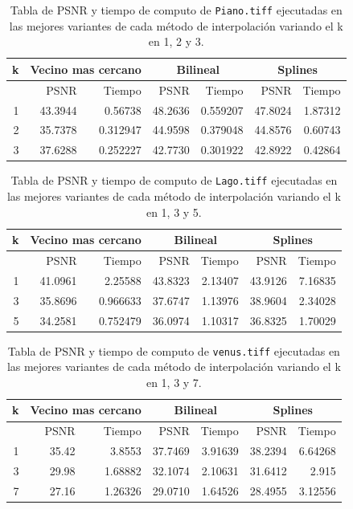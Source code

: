 \documentclass[a4paper]{article}
\newcounter{col}
\begin{document}
\begin{table}[H]
\centering
\begin{tabular}{|r|r|r|r|r|r|r|}
\hline
\multicolumn{1}{|c|}{k} & \multicolumn{2}{|c|}{Vecino mas cercano} & \multicolumn{2}{|c|}{Bilineal} & \multicolumn{2}{|c|}{Splines} \\ \hline
  & PSNR & Tiempo & PSNR & Tiempo & PSNR & Tiempo \\ \hline
1 & 43.3944& 0.56738 & 48.2636 &  0.559207 &  47.8024 & 1.87312 \\ \hline
2 & 35.7378 & 0.312947 & 44.9598 & 0.379048 &  44.8576 & 0.60743 \\ \hline
3 & 37.6288& 0.252227 & 42.7730 & 0.301922 &  42.8922 & 0.42864 \\ \hline
\end{tabular}
\caption{Tabla de PSNR y tiempo de computo de \texttt{Piano.tiff} ejecutadas en las mejores variantes de cada m\'etodo de interpolaci\'on variando el k en 1, 2 y 3.}
\label{}
\end{table}


\begin{table}[H]
\centering
\begin{tabular}{|r|r|r|r|r|r|r|}
\hline
\multicolumn{1}{|c|}{k} & \multicolumn{2}{|c|}{Vecino mas cercano} & \multicolumn{2}{|c|}{Bilineal} & \multicolumn{2}{|c|}{Splines} \\ \hline
  & PSNR & Tiempo & PSNR & Tiempo & PSNR & Tiempo \\ \hline
1 & 41.0961 & 2.25588 & 43.8323 & 2.13407 &  43.9126 & 7.16835 \\ \hline
3 & 35.8696 & 0.966633 & 37.6747 & 1.13976 &  38.9604 & 2.34028 \\ \hline
5 & 34.2581& 0.752479 & 36.0974 & 1.10317 &  36.8325 & 1.70029 \\ \hline
\end{tabular}
\caption{Tabla de PSNR y tiempo de computo de \texttt{Lago.tiff} ejecutadas en las mejores variantes de cada m\'etodo de interpolaci\'on variando el k en 1, 3 y 5.}
\label{}
\end{table}


\begin{table}[H]
\centering
\begin{tabular}{|r|r|r|r|r|r|r|}
\hline
\multicolumn{1}{|c|}{k} & \multicolumn{2}{|c|}{Vecino mas cercano} & \multicolumn{2}{|c|}{Bilineal} & \multicolumn{2}{|c|}{Splines} \\ \hline
  & PSNR & Tiempo & PSNR & Tiempo & PSNR & Tiempo \\ \hline
1 & 35.42 & 3.8553 & 37.7469 & 3.91639 &  38.2394 & 6.64268 \\ \hline
3 & 29.98 & 1.68882 & 32.1074 & 2.10631 &  31.6412 & 2.915 \\ \hline
7 & 27.16 & 1.26326 &  29.0710 & 1.64526 & 28.4955 & 3.12556 \\ \hline
\end{tabular}
\caption{Tabla de PSNR y tiempo de computo de \texttt{venus.tiff} ejecutadas en las mejores variantes de cada m\'etodo de interpolaci\'on variando el k en 1, 3 y 7.}
\label{}
\end{table}
\end{document}
